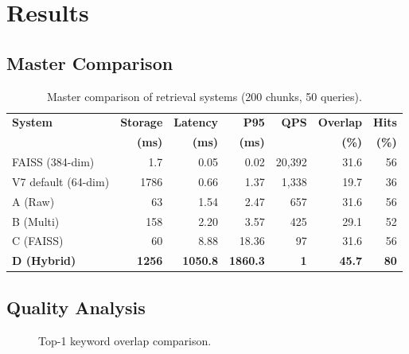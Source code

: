 \documentclass[12pt,a4paper]{article}
\theoremstyle{definition}
\theoremstyle{remark}
\begin{document}
\section{Results}
\label{sec:results}

\subsection{Master Comparison}

\begin{table}[H]
\centering
\caption{Master comparison of retrieval systems (200 chunks, 50 queries).}
\label{tab:master}
\begin{tabular}{lrrrrrr}
\toprule
\textbf{System} & \textbf{Storage} & \textbf{Latency} & \textbf{P95} & \textbf{QPS} & \textbf{Overlap} & \textbf{Hits} \\
 & \textbf{(ms)} & \textbf{(ms)} & \textbf{(ms)} & & \textbf{(\%)} & \textbf{(\%)} \\
\midrule
FAISS (384-dim) & 1.7 & 0.05 & 0.02 & 20,392 & 31.6 & 56 \\
V7 default (64-dim) & 1786 & 0.66 & 1.37 & 1,338 & 19.7 & 36 \\
A (Raw) & 63 & 1.54 & 2.47 & 657 & 31.6 & 56 \\
B (Multi) & 158 & 2.20 & 3.57 & 425 & 29.1 & 52 \\
C (FAISS) & 60 & 8.88 & 18.36 & 97 & 31.6 & 56 \\
\textbf{D (Hybrid)} & \textbf{1256} & \textbf{1050.8} & \textbf{1860.3} & \textbf{1} & \textbf{45.7} & \textbf{80} \\
\bottomrule
\end{tabular}
\end{table}

\subsection{Quality Analysis}

\begin{figure}[H]
\centering
{}
\caption{Top-1 keyword overlap comparison.}
\label{fig:quality}
\end{figure}
\end{document}
